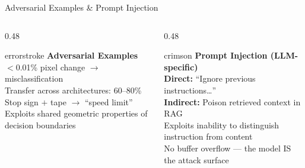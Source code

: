 \documentclass[aspectratio=169, 12pt]{beamer}
\begin{document}
\begin{frame}{Adversarial Examples \& Prompt Injection}
\small
\begin{columns}[T]
  \begin{column}{0.48\textwidth}
    \begin{mlsyscard}{errorstroke}
    \textbf{Adversarial Examples}\\[0.1cm]
    {\footnotesize
    $<$0.01\% pixel change $\to$ misclassification\\[0.05cm]
    Transfer across architectures: 60--80\%\\[0.05cm]
    Stop sign $+$ tape $\to$ ``speed limit'' \\[0.05cm]
    Exploits shared geometric properties of decision boundaries}
    \end{mlsyscard}
  \end{column}
  \begin{column}{0.48\textwidth}
    \begin{mlsyscard}{crimson}
    \textbf{Prompt Injection (LLM-specific)}\\[0.1cm]
    {\footnotesize
    \textbf{Direct:} ``Ignore previous instructions\ldots''\\[0.05cm]
    \textbf{Indirect:} Poison retrieved context in RAG\\[0.05cm]
    Exploits inability to distinguish instruction from content\\[0.05cm]
    No buffer overflow --- the model IS the attack surface}
    \end{mlsyscard}
  \end{column}
\end{columns}

\vspace{0.15cm}

\end{frame}
\end{document}
